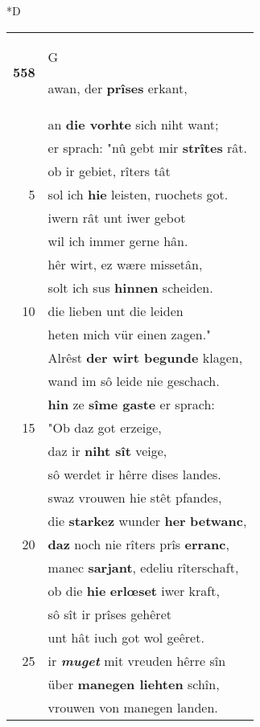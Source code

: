 \documentclass[8pt,a4paper,notitlepage]{article}
\begin{document}
\begin{table}[ht]
\begin{minipage}[t]{0.5\linewidth}
\small
\begin{center}*D
\end{center}
\begin{tabular}{rl}
\textbf{558} & \begin{large}G\end{large}awan, der \textbf{prîses} erkant,\\ 
 & an \textbf{die vorhte} sich niht want;\\ 
 & er sprach: "nû gebt mir \textbf{strîtes} rât.\\ 
 & ob ir gebiet, rîters tât\\ 
5 & sol ich \textbf{hie} leisten, ruochets got.\\ 
 & iwern rât unt iwer gebot\\ 
 & wil ich immer gerne hân.\\ 
 & hêr wirt, ez wære missetân,\\ 
 & solt ich sus \textbf{hinnen} scheiden.\\ 
10 & die lieben unt die leiden\\ 
 & heten mich vür einen zagen."\\ 
 & Alrêst \textbf{der wirt begunde} klagen,\\ 
 & wand im sô leide nie geschach.\\ 
 & \textbf{hin} ze \textbf{sîme gaste} er sprach:\\ 
15 & "Ob daz got erzeige,\\ 
 & daz ir \textbf{niht sît} veige,\\ 
 & sô werdet ir hêrre dises landes.\\ 
 & swaz vrouwen hie stêt pfandes,\\ 
 & die \textbf{starkez} wunder \textbf{her} \textbf{betwanc},\\ 
20 & \textbf{daz} noch nie rîters prîs \textbf{erranc},\\ 
 & manec \textbf{sarjant}, edeliu rîterschaft,\\ 
 & ob die \textbf{hie} \textbf{erlœset} iwer kraft,\\ 
 & sô sît ir prîses gehêret\\ 
 & unt hât iuch got wol geêret.\\ 
25 & ir \textit{\textbf{muget}} mit vreuden hêrre sîn\\ 
 & über \textbf{manegen liehten} schîn,\\ 
 & vrouwen von manegen landen.\\ 

\end{tabular}
\end{minipage}
\end{table}
\end{document}
